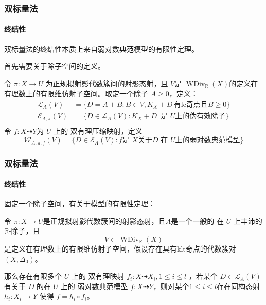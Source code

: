 \documentclass[10pt]{ctexbeamer}
\begin{document}
\begin{frame}[shrink]
  \frametitle{双标量法}
  \framesubtitle{终结性}
  双标量法的终结性本质上来自弱对数典范模型的有限性定理。

  \pause
  首先需要关于除子空间的定义。
\begin{definition}\label{polytopeofdivisor}
  \citeauthor[Definition 1.1.4]{BCHM10} 令 $ \pi: X\to U $ 为正规拟射影代数簇间的射影态射，且 $ V $是 $ \operatorname{WDiv}_{\mathbb{R}}(X) $的定义在有理数上的有限维仿射子空间。取定一个除子 $ A\geqslant 0 $，定义：
  \[
    \begin{aligned}
      \mathcal{L}_A(V)       & =\{D=A+B:B \in V,  K_X+D\, \text{有lc奇点且} B\geqslant0 \} \\
    \mathcal{E}_{A,\pi}(V) & =\{D\in \mathcal{L}_A(V): K_X+D\, \text{ 是 } U \text{上的伪有效除子}\}  \\
    \end{aligned}
  \]
  令 $ f:X \dashrightarrow Y$为 $U$ 上的 双有理压缩映射，定义
  \[ \mathcal{W}_{A,\pi,f}(V)=\{D\in \mathcal{E}_{A}(V): f \text{是   } X \text{关于}D \text{ 在 }U \text{上的弱对数典范模型}\} \]
\end{definition}
\end{frame}

\begin{frame}[shrink]
  \frametitle{双标量法}
  \framesubtitle{终结性}
  固定一个除子空间，有关于模型的有限性定理：
\begin{theorem}\citeauthor[Theorem E]{BCHM10}\label{finitewlcm}
  令 $\pi: X\to U$是正规拟射影代数簇间的射影态射，且$A$是一个一般的 在 $U$ 上丰沛的$\mathbb{R}$-除子，且
    \[ V \subset \operatorname{WDiv}_{\mathbb{R}}(X) \]
  是定义在有理数上的有限维仿射子空间，假设存在具有klt奇点的代数簇对 $(X,\Delta_{0})$。

  那么存在有限多个 $U$ 上的 双有理映射 $f_{i}:X \dashrightarrow X_{i},1\leqslant i\leqslant l$ ，若某个 $D \in \mathcal{L}_{A}(V)$ 有关于 $D$ 的在 $U$ 上的  弱对数典范模型 $f:X \dashrightarrow  Y$，则对某个$1\leqslant i\leqslant l$存在同构态射  $h_{i}:X_{i} \to Y$ 使得 $f=h_{i}\circ f_{i}$。
\end{theorem}
\end{frame}
\end{document}
